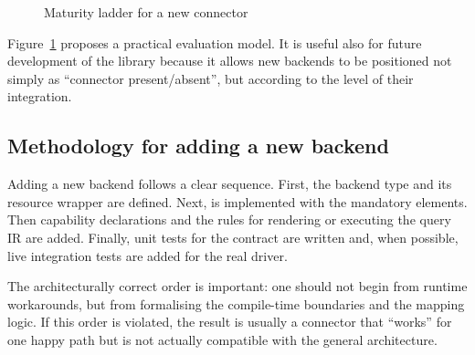 \begin{figure}[H]
\centering
{}
\caption{Maturity ladder for a new connector}
\label{fig:connector_maturity_ladder}
\end{figure}

Figure~\ref{fig:connector_maturity_ladder} proposes a practical evaluation model. It is useful also for future development of the library because it allows new backends to be positioned not simply as ``connector present/absent'', but according to the level of their integration.

\subsection{Methodology for adding a new backend}

Adding a new backend follows a clear sequence. First, the backend type and its resource wrapper are defined. Next,  is implemented with the mandatory elements. Then capability declarations and the rules for rendering or executing the query IR are added. Finally, unit tests for the contract are written and, when possible, live integration tests are added for the real driver.

The architecturally correct order is important: one should not begin from runtime workarounds, but from formalising the compile-time boundaries and the mapping logic. If this order is violated, the result is usually a connector that ``works'' for one happy path but is not actually compatible with the general architecture.

